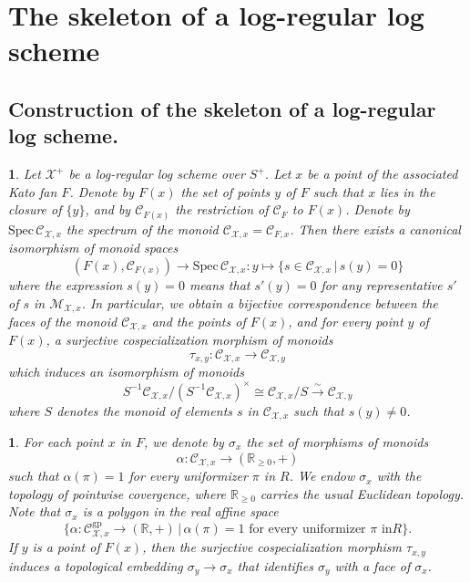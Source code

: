 \documentclass{amsart}%
\numberwithin{equation}{subsection}
\theoremstyle{plain2}
\theoremstyle{definition2}
\theoremstyle{stepstyle}
\theoremstyle{point}
\theoremstyle{subpoint}
\newtheorem{subpoint}[equation]{}%
\newcommand{\spa}[1]{\begin{subpoint}#1\end{subpoint}}           %
\newcommand{\R}{\ensuremath{\mathbb{R}}}
\newcommand{\cX}{\ensuremath{\mathscr{X}}}
\renewcommand{\R}{\ensuremath{\mathbb{R}}}
\newcommand{\Spec}{\ensuremath{\mathrm{Spec}\,}}
\newcommand{\gp}{\mathrm{gp}}
\begin{document}
\section{The skeleton of a log-regular log scheme} \label{sect skeleton log}
\subsection{Construction of the skeleton of a log-regular log scheme.}

\spa{Let $\cX^+$ be a log-regular log scheme over $S^+$. Let $x$ be a point of the associated Kato fan $F$. Denote by $F(x)$ the set of points
$y$ of $F$ such that $x$ lies in the closure of $\{y\}$, and by
$\mathcal{C}_{F(x)}$ the restriction of $\mathcal{C}_F$ to $F(x)$.
Denote
 by $\Spec \mathcal{C}_{\cX,x}$ the spectrum of the monoid
$\mathcal{C}_{\cX,x}=\mathcal{C}_{F,x}$. Then there exists a
canonical isomorphism of
 monoid spaces
$$(F(x),\mathcal{C}_{F(x)})\to \Spec \mathcal{C}_{\cX,x}:y\mapsto \{s\in \mathcal{C}_{\cX,x}\,|\,s(y)= 0\}$$
 where the expression $s(y)= 0$ means that $s'(y)= 0$ for any representative $s'$ of $s$ in $\mathcal{M}_{\cX,x}$.
   In particular, we obtain a bijective correspondence between the
 faces of the monoid $\mathcal{C}_{\cX,x}$ and the points of $F(x)$,
 and for every point $y$ of $F(x)$, a surjective cospecialization morphism of monoids
$$\tau_{x,y}:\mathcal{C}_{\cX,x}\to \mathcal{C}_{\cX,y}$$ which
induces an isomorphism of monoids
 $$S^{-1}\mathcal{C}_{\cX,x}/(S^{-1}\mathcal{C}_{\cX,x})^{\times}\cong \mathcal{C}_{\cX,x}/S \xrightarrow{\sim}
 \mathcal{C}_{\cX,y}$$ where $S$ denotes the monoid of elements $s$
 in $\mathcal{C}_{\cX,x}$ such that $s(y)\neq 0$.}
\spa{For each point $x$ in $F$, we denote by $\sigma_x$ the set
of morphisms of monoids
 $$\alpha:\mathcal{C}_{\cX,x}\to (\R_{\geq 0},+)$$ such that
 $\alpha(\pi)=1$ for every uniformizer $\pi$ in $R$.
 We endow $\sigma_x$ with the topology of
 pointwise covergence, where $\R_{\geq 0}$ carries the usual Euclidean
 topology. Note that $\sigma_x$ is a polygon in the real affine
 space
$$\{\alpha:\mathcal{C}^{\gp}_{\cX,x}\to (\R,+)\,|\,\alpha(\pi)=1\mbox{ for every uniformizer }\pi\mbox{ in
}R\}.$$ If $y$ is a point of $F(x)$, then the surjective
cospecialization morphism $\tau_{x,y}$ induces a topological
embedding $\sigma_y\to \sigma_x$ that identifies $\sigma_y$ with a face of $\sigma_x$.}
\end{document}
